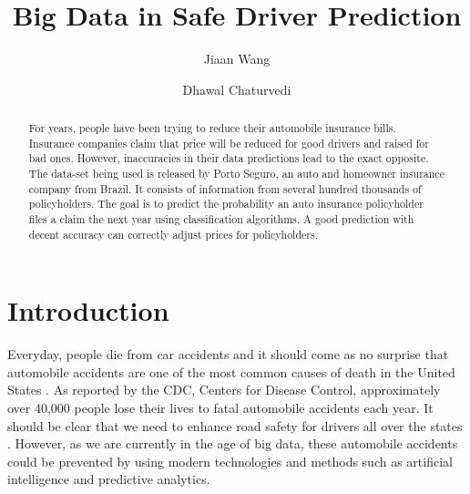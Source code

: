 \title{Big Data in Safe Driver Prediction}

\author{Jiaan Wang}

\author{Dhawal Chaturvedi}
    
\begin{abstract}

    For years, people have been trying to reduce their automobile
    insurance bills. Insurance companies claim that price will be
    reduced for good drivers and raised for bad ones. However,
    inaccuracies in their data predictions lead to the exact
    opposite. The data-set being used is released by Porto Seguro,
    an auto and homeowner insurance company from Brazil. It
    consists of information from several hundred thousands of
    policyholders. The goal is to predict the probability an auto
    insurance policyholder files a claim the next year using
    classification algorithms. A good prediction with decent
    accuracy can correctly adjust prices for policyholders.
    
\end{abstract}


\maketitle

\section{Introduction}

Everyday, people die from car accidents and it should come as no surprise that automobile accidents are one of the most common causes of death in the United States \cite{Suizo2015decisions}. As reported by the CDC, Centers for Disease Control, approximately over 40,000 people lose their lives to fatal automobile accidents each year. It should be clear that we need to enhance road safety for drivers all over the states \cite{Mills2017safety}. However, as we are currently in the age of big data, these automobile accidents could be prevented by using modern technologies and methods such as artificial intelligence and predictive analytics. 

